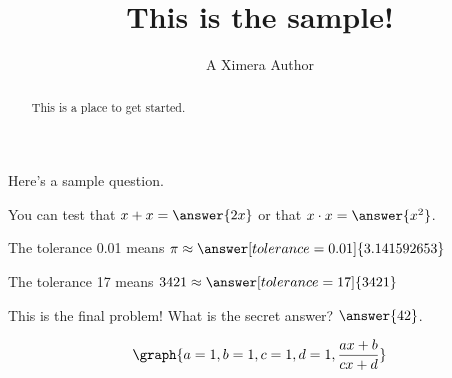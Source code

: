 \documentclass{ximera}
\title{This is the sample!}
\author{A Ximera Author}
\begin{document}
\begin{abstract}
  This is a place to get started.
\end{abstract}

\maketitle

Here's a sample question.

\begin{problem}
\begin{multipleChoice}
\end{multipleChoice}
\end{problem}

\begin{problem}
   You can test that $x + x = \answer{2x}$ or that $x \cdot x = \answer{x^2}$.
\end{problem}

\begin{problem}
   The tolerance 0.01 means $\pi \approx \answer[tolerance=0.01]{3.141592653}$
\end{problem}

\begin{problem}
   The tolerance 17 means $3421 \approx \answer[tolerance=17]{3421}$
\end{problem}

\begin{problem}
    This is the final problem! What is the secret answer? $\answer{42}$.
\end{problem}

\begin{question}
    \[
        \graph{a=1, b=1, c=1, d=1, \frac{ax+b}{cx+d}}    
    \]
    
\end{question}
\end{document}
